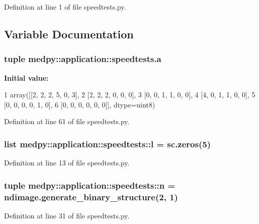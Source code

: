Definition at line 1 of file speedtests.py.



\subsection{Variable Documentation}
\hypertarget{namespacemedpy_1_1application_1_1speedtests_acf1909a76f5fe1e6cad90748d1d87f9f}{
\subsubsection[{a}]{\setlength{\rightskip}{0pt plus 5cm}tuple {\bf medpy::application::speedtests.a}}}
\label{namespacemedpy_1_1application_1_1speedtests_acf1909a76f5fe1e6cad90748d1d87f9f}
{\bfseries Initial value:}
\begin{DoxyCode}
1 array([[2, 2, 2, 5, 0, 3],
2        [2, 2, 2, 0, 0, 0],
3        [0, 0, 1, 1, 0, 0],
4        [4, 0, 1, 1, 0, 0],
5        [0, 0, 0, 0, 1, 0],
6        [0, 0, 0, 0, 0, 0]], dtype=uint8)
\end{DoxyCode}


Definition at line 61 of file speedtests.py.

\hypertarget{namespacemedpy_1_1application_1_1speedtests_a1c6abdc476535c657d50d76cfcae0422}{
\subsubsection[{l}]{\setlength{\rightskip}{0pt plus 5cm}list {\bf medpy::application::speedtests::l} = sc.zeros(5)}}
\label{namespacemedpy_1_1application_1_1speedtests_a1c6abdc476535c657d50d76cfcae0422}


Definition at line 13 of file speedtests.py.

\hypertarget{namespacemedpy_1_1application_1_1speedtests_a0c0410111fa568445a440b6d87f02b42}{
\subsubsection[{n}]{\setlength{\rightskip}{0pt plus 5cm}tuple {\bf medpy::application::speedtests::n} = ndimage.generate\_\-binary\_\-structure(2, 1)}}
\label{namespacemedpy_1_1application_1_1speedtests_a0c0410111fa568445a440b6d87f02b42}


Definition at line 31 of file speedtests.py.

